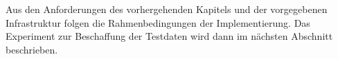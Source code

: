 \label{chap:method}
Aus den Anforderungen des vorhergehenden Kapitels und der vorgegebenen Infrastruktur folgen die Rahmenbedingungen der Implementierung. Das Experiment zur Beschaffung der Testdaten wird dann im nächsten Abschnitt beschrieben.


